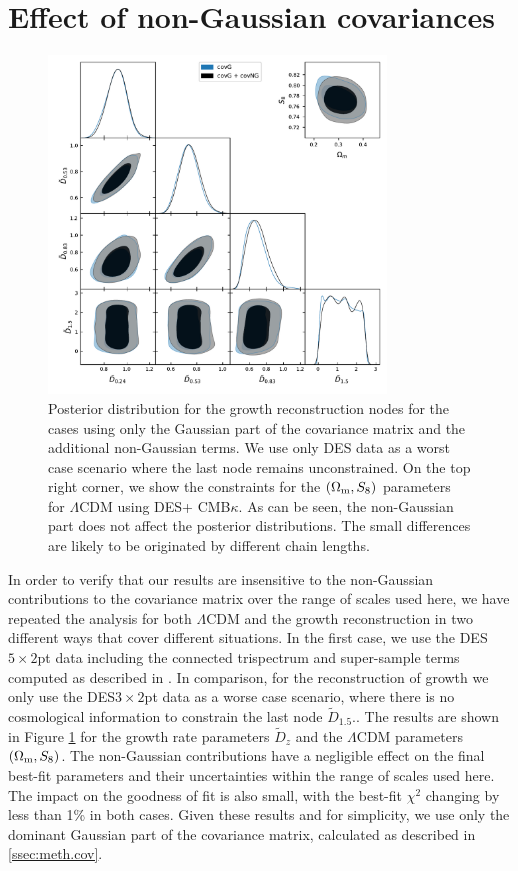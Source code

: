 \documentclass[a4paper,11pt]{article}
\newcommand{\Om}{\Omega_{\rm m}}
\newcommand{\lcdm}{$\Lambda$CDM\xspace}
\newcommand{\cmbk}{CMB$\kappa$\xspace}
\newcommand{\des}{DES\xspace}
\begin{document}
  
\appendix
    
    \section{Effect of non-Gaussian covariances}\label{app:cov}
  
      \begin{figure}
        \centering
        \includegraphics[width=0.8\textwidth]{figures/SD_covG_covGNG.pdf}
        \caption{Posterior distribution for the growth reconstruction nodes for the cases using only the Gaussian part of the covariance matrix and the additional non-Gaussian terms. We use only \des data as a worst case scenario where the last node remains unconstrained. On the top right corner, we show the constraints for the $(\Om, S_8)$ parameters for \lcdm using \des + \cmbk. As can be seen, the non-Gaussian part does not affect the posterior distributions. The small differences are likely to be originated by different chain lengths.}\label{fig:covGvscovGNG}
      \end{figure}
          In order to verify that our results are insensitive to the non-Gaussian contributions to the covariance matrix over the range of scales used here, we have repeated the analysis for both \lcdm and the growth reconstruction in two different ways that cover different situations. In the first case, we use the \des $5\times2$pt data including the connected trispectrum and super-sample terms computed as described in \cite{1912.08209}. In comparison, for the reconstruction of growth we only use the \des $3\times2$pt data as a worse case scenario, where there is no cosmological information to constrain the last node $\tilde{D}_{1.5}$.. The results are shown in Figure \ref{fig:covGvscovGNG} for the growth rate parameters $\tilde{D}_z$ and the \lcdm parameters $(\Om,S_8)$. The non-Gaussian contributions have a negligible effect on the final best-fit parameters and their uncertainties within the range of scales used here. The impact on the goodness of fit is also small, with the best-fit $\chi^2$ changing by less than 1\% in both cases. Given these results and for simplicity, we use only the dominant Gaussian part of the covariance matrix, calculated as described in \ref{ssec:meth.cov}.
\end{document}
